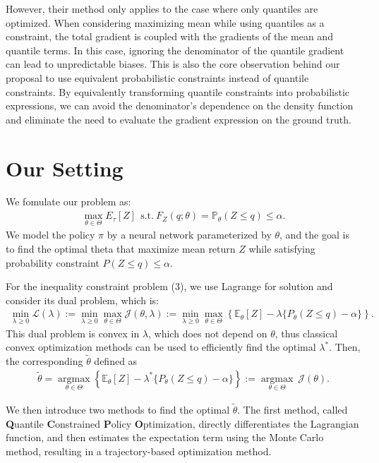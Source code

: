 However, their method only applies to the case where only quantiles are optimized. When considering maximizing mean while using quantiles as a constraint, the total gradient is coupled with the gradients of the mean and quantile terms. In this case, ignoring the denominator of the quantile gradient can lead to unpredictable biases. \textcolor{ECNURed}{This is also the core observation behind our proposal to use equivalent probabilistic constraints instead of quantile constraints. By equivalently transforming quantile constraints into probabilistic expressions, we can avoid the denominator's dependence on the density function and eliminate the need to evaluate the gradient expression on the ground truth.}

\section{Our Setting}
We fomulate our problem as:
\begin{align} 
    \max_{\theta \in \Theta}E_{\tau}[Z] ~~\text{s.t.}~F_Z(q;\theta)=\mathbb P_\theta(Z\le q)\le \alpha.
\end{align}
We model the policy $\pi$ by a neural network parameterized by $\theta$, and the goal is to find the optimal theta that maximize mean return $Z$ while satisfying probability constraint $P(Z\leq q)\leq \alpha$.

For the inequality constraint problem (3), we use Lagrange for solution and consider its dual problem, which is: 
\begin{align} \label{dual-lag}
    \min_{\lambda\geq0}\mathcal{L}(\lambda)
    := \min_{\lambda\geq0}\max_{\theta\in\Theta}\mathcal{J}(\theta,\lambda)
    :=\min_{\lambda\geq0}\max_{\theta\in\Theta}\left\{\mathbb{E}_{\theta}[Z]-\lambda\{P_\theta(Z\le q) - \alpha\}\right\}.
\end{align}
This dual problem is convex in $\lambda$, which does not depend on $\theta$, thus classical convex optimization methods can be used to efficiently find the optimal $\lambda^*$. Then, the corresponding $\tilde{\theta}$ defined as
\begin{align} \label{eq:lag-dual}
    \tilde{\theta}=\mathop{\arg\max}\limits_{\theta\in\Theta} \left\{\mathbb{E}_{\theta}[Z]-\lambda^*\{P_\theta(Z\le q) - \alpha\}\right\} := \mathop{\arg\max}\limits_{\theta\in\Theta}~\mathcal{J}(\theta).
\end{align}

We then introduce two methods to find the optimal $\tilde{\theta}$. The first method, called \textbf{Q}uantile \textbf{C}onstrained \textbf{P}olicy \textbf{O}ptimization, directly differentiates the Lagrangian function, and then estimates the expectation term using the Monte Carlo method, resulting in a trajectory-based optimization method.

